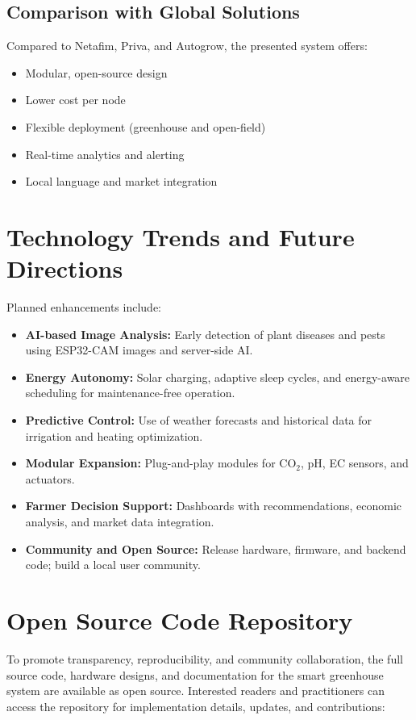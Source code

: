\documentclass[12pt,a4paper]{article}
\begin{document}
\subsection{Comparison with Global Solutions}
Compared to Netafim, Priva, and Autogrow, the presented system offers:
\begin{itemize}
    \item Modular, open-source design
    \item Lower cost per node
    \item Flexible deployment (greenhouse and open-field)
    \item Real-time analytics and alerting
    \item Local language and market integration
\end{itemize}

\section{Technology Trends and Future Directions}
Planned enhancements include:
\begin{itemize}
    \item \textbf{AI-based Image Analysis:} Early detection of plant diseases and pests using ESP32-CAM images and server-side AI.
    \item \textbf{Energy Autonomy:} Solar charging, adaptive sleep cycles, and energy-aware scheduling for maintenance-free operation.
    \item \textbf{Predictive Control:} Use of weather forecasts and historical data for irrigation and heating optimization.
    \item \textbf{Modular Expansion:} Plug-and-play modules for CO$_2$, pH, EC sensors, and actuators.
    \item \textbf{Farmer Decision Support:} Dashboards with recommendations, economic analysis, and market data integration.
    \item \textbf{Community and Open Source:} Release hardware, firmware, and backend code; build a local user community.
\end{itemize}

\section{Open Source Code Repository}
To promote transparency, reproducibility, and community collaboration, the full source code, hardware designs, and documentation for the smart greenhouse system are available as open source. Interested readers and practitioners can access the repository for implementation details, updates, and contributions:
\end{document}
